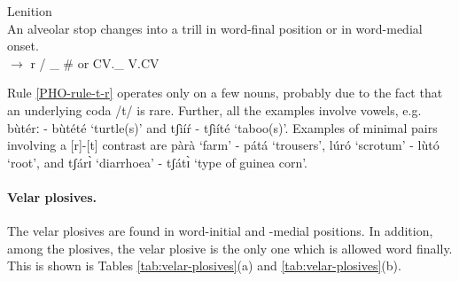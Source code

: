 \begin{Rule}\label{PHO-rule-t-r}{Lenition}\\
An  alveolar stop changes into a  trill in word-final position or in word-medial onset.\\
 {} $\rightarrow$  r   /   \_ \#  or  CV.\_ V.CV
\end{Rule}





Rule \ref{PHO-rule-t-r} operates  only on a few nouns, probably due to the fact 
that an underlying coda /t/ is rare.  Further,  all the examples involve {\sc 
[+atr, --ro]} vowels,  e.g. {\sls bùtérː} - {\sls bùtété} `turtle(s)' and 
{\sls tʃìíŕ} - {\sls tʃìíté} `taboo(s)'.  Examples of minimal pairs 
involving 
a [r]-[t] contrast are  {\sls pàrà}  `farm' -  {\sls pátá}  `trousers', 
{\sls lúró} `scrotum' - {\sls lùtó} `root', and {\sls tʃárɪ̀} 
`diarrhoea' - {\sls tʃátɪ̀} `type of guinea corn'.


\paragraph{Velar plosives.}
\label{sec:PHO-vel-plos}  

The velar plosives are found in word-initial and -medial positions. In addition, 
among the plosives,  the velar plosive is the only one which is allowed word 
finally. This is shown is Tables \ref{tab:velar-plosives}(a)  and 
\ref{tab:velar-plosives}(b). 



